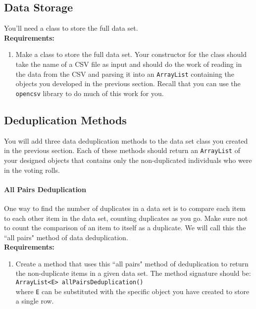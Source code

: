 \documentclass[12pt]{article}
\begin{document}
\subsection{Data Storage}

You'll need a class to store the full data set.\\

\textbf{Requirements:}
\begin{enumerate}
\item Make a class to store the full data set.  Your constructor for the class should take the name of a CSV file as input and should do the work of reading in the data from the CSV and parsing it into an \verb+ArrayList+ containing the objects you developed in the previous section.  Recall that you can use the \verb+opencsv+ library to do much of this work for you.
\end{enumerate}

\subsection{Deduplication Methods}

You will add three data deduplication methods to the data set class you created in the previous section.  Each of these methods should return an \verb+ArrayList+ of your designed objects that contains only the non-duplicated individuals who were in the voting rolls.

\paragraph{All Pairs Deduplication}
One way to find the number of duplicates in a data set is to compare each item to each other item in the data set, counting duplicates as you go. Make sure not to count the comparison of an item to itself as a duplicate.  We will call this the ``all pairs" method of data deduplication.\\

\textbf{Requirements:}
\begin{enumerate}[start=1]
\item Create a method that uses this ``all pairs" method of deduplication to return the non-duplicate items in a given data set.  The method signature should be:\\
\verb+ArrayList<E> allPairsDeduplication()+\\
where \verb+E+ can be substituted with the specific object you have created to store a single row.
\end{enumerate}
\end{document}
